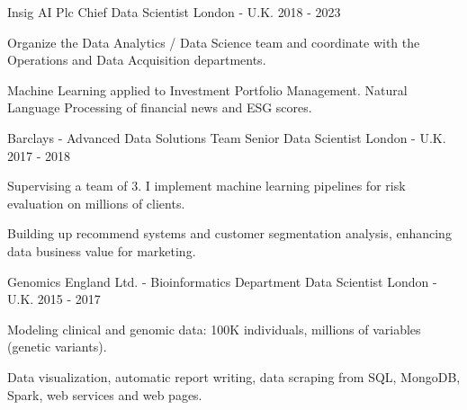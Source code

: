 \begin{cventries}

\cventry
{Insig AI Plc} %
{Chief Data Scientist} %
{London - U.K.} %
{2018 - 2023} %
{ %
\begin{cvitems}
\item {Organize the Data Analytics / Data Science team and coordinate with the Operations and Data Acquisition departments.}
\item {Machine Learning applied to Investment Portfolio Management. Natural Language Processing of financial news and ESG scores.}
\end{cvitems}
}


\cventry
{Barclays - Advanced Data Solutions Team} %
{Senior Data Scientist} %
{London - U.K.} %
{2017 - 2018} %
{ %
\begin{cvitems}
\item {Supervising a team of 3. I implement machine learning pipelines for risk evaluation on millions of clients.}
\item {Building up recommend systems and customer segmentation analysis, enhancing data business value for marketing.}
\end{cvitems}
}


\cventry
{Genomics England Ltd. - Bioinformatics Department} %
{Data Scientist} %
{London - U.K.} %
{2015 - 2017} %
{ %
\begin{cvitems}
\item {Modeling clinical and genomic data: 100K individuals, millions of variables (genetic variants).}
\item {Data visualization, automatic report writing, data scraping from SQL, MongoDB, Spark, web services and web pages.}
\end{cvitems}
}


\end{cventries}
